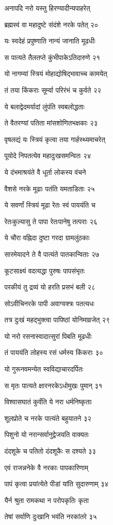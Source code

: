 अनापदि नरो यस्तु हिरण्यादीन्यपाहरेत्

ब्रह्मस्वं वा महादुष्टे संदंशे नरके पतेत् २०

यः स्वदेहं प्रपुष्णाति नान्यं जानाति मूढधीः

स पात्यते तैलतप्ते कुंभीपाकेऽतिदारुणे २१

यो नागम्यां स्त्रियं मोहाद्योषिद्भावाच्च कामयेत्

तं तया किंकराः सूर्म्या परिरंभं च कुर्वते २२

ये बलाद्वेदमर्यादां लुंपंति स्वबलोद्धताः

ते वैतरण्यां पतिता मांसशोणितभक्षकाः २३

वृषलद्यं यः स्त्रियं कृत्वा तया गार्हस्थ्यमाचरेत्

पूयोदे निपतत्येव महादुःखसमन्वितः २४

ये दंभमाश्रयंते वै धूर्ता लोकस्य वंचने

वैशसे नरके मूढाः पतंति यमताडिताः २५

ये सवर्णां स्त्रियं मूढा रेतः स्वं पाययंति च

रेतःकुल्यासु ते पापा रेतःपानेषु तत्पराः २६

ये चौरा वह्निदा दुष्टा गरदा ग्रामलुंठकाः

सारमेयादने ते वै पात्यंते पातकान्विताः २७

कूटसाक्ष्यं वदत्यद्धा पुरुषः पापसंभृतः

परकीयं तु द्रव्यं यो हरति प्रसभं बली २८

सोऽवीचिनरके पापी अवाग्वक्त्रः पतत्यधः

तत्र दुःखं महद्भुक्त्वा पापिष्ठां योनिमाव्रजेत् २९

यो नरो रसनास्वादात्सुरां पिबति मूढधीः

तं पाययंति लोहस्य रसं धर्मस्य किंकराः ३०

यो गुरूनवमन्येत स्वविद्याचारदर्पितः

स मृतः पात्यते क्षारनरकेऽधोमुखः पुमान् ३१

विश्वासघातं कुर्वंति ये नरा धर्मनिष्कृताः

शूलप्रोते च नरके पात्यंते बहुयातने ३२

पिशुनो यो नरान्सर्वानुद्वेजयति वाक्यतः

दंदशूके च पतितो दंदशूकैः स दश्यते ३३

एवं राजन्ननेके वै नरकाः पापकारिणाम्

पापं कृत्वा प्रयांत्येते पीडां यांति सुदारुणाम् ३४

यैर्न श्रुता रामकथा न परोपकृतिः कृता

तेषां सर्वाणि दुःखानि भवंति नरकांतरे ३५

